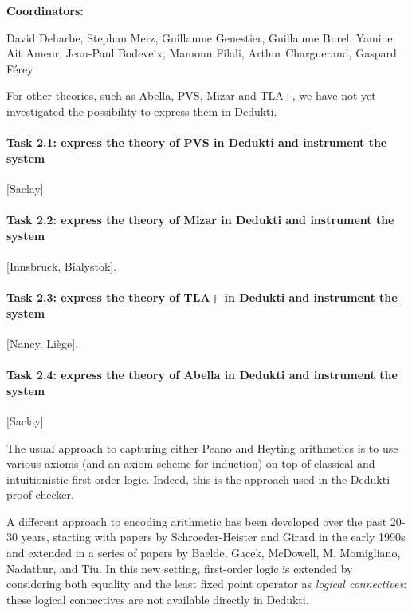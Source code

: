 {\bf Coordinators:}


David Deharbe, Stephan Merz, Guillaume Genestier, Guillaume
Burel, Yamine Ait Ameur, Jean-Paul Bodeveix, Mamoun Filali, Arthur
Chargueraud, Gaspard Férey

For other theories, such as Abella, PVS, Mizar and TLA+, we have not yet investigated the possibility to express them in Dedukti.

\paragraph{Task 2.1: express the theory of PVS in Dedukti and instrument the system}

[Saclay]


\paragraph{Task 2.2: express the theory of Mizar in Dedukti and instrument the system}


[Innsbruck, Bialystok].

\paragraph{Task 2.3: express the theory of TLA+ in Dedukti and instrument the system}

[Nancy, Liège].

\paragraph{Task 2.4: express the theory of Abella in Dedukti and instrument the system}

[Saclay]

The usual approach to capturing either Peano and Heyting arithmetics
is to use various axioms (and an axiom scheme for induction) on top of
classical and intuitionistic first-order logic.  Indeed, this is the
approach used in the Dedukti proof checker.


A different approach to encoding arithmetic has been developed over
the past 20-30 years, starting with papers by Schroeder-Heister and
Girard in the early 1990s and extended in a series of papers by
Baelde, Gacek, McDowell, M, Momigliano, Nadathur, and Tiu.  In this
new setting, first-order logic is extended by considering both
equality and the least fixed point operator as \emph{logical
  connectives}: these logical connectives are not available directly
in Dedukti.

